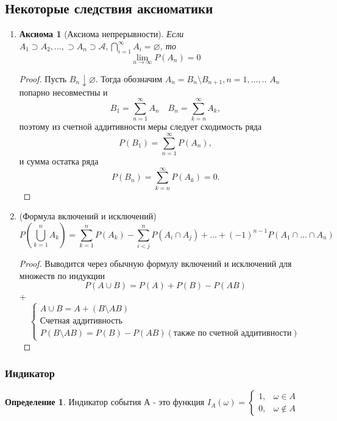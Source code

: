 \documentclass[a4paper]{article}
\newtheorem*{axiom}{Аксиома}
\theoremstyle{definition}
\newtheorem*{definition}{Определение}
\theoremstyle{remark}
\begin{document}
\subsection{Некоторые следствия аксиоматики}
\begin{enumerate}
    \item \begin{axiom}[Аксиома непрерывности]
        Если $A_1\supset A_2, \dots, \supset A_n \supset \mathcal{A}, \bigcap\limits_{i = 1}^\infty A_i = \varnothing$, то
        \[\lim\limits_{n\to \infty} P(A_n) = 0\]
    \end{axiom}
    \begin{proof}
        Пусть $B_n\downarrow \varnothing$. Тогда обозначим $A_n = B_n \setminus B_{n+1}, n = 1, \dots, .$. $A_n$ попарно несовместны и 
        \[B_1  =    \sum\limits_{n = 1}^\infty A_n \quad B_n  =  \sum\limits_{k = n}^\infty A_k, \]
        поэтому из счетной аддитивности меры следует сходимость ряда \[P(B_1)=\sum\limits_{n = 1}^\infty P(A_n),\] и сумма остатка ряда \[P(B_n) =  \sum\limits_{k = n}^\infty P(A_k) = 0.\] 
    \end{proof}
    \item (Формула включений и исключений)
    \[P(\bigcup\limits_{k = 1}^n A_k)  = \sum_{k = 1}^n P(A_k) - \sum_{i < j}^n P(A_i \cap A_j) + \dots + {(-1)}^{n-1} P(A_1 \cap \dots  \cap A_n)\]
    \begin{proof}
        Выводится через обычную формулу включений и исключений для множеств по индукции \[P(A \cup B) = P(A) + P(B) - P(AB)\]+ 
        \[\begin{cases}
            A \cup B = A + (B\setminus AB) \\ 
            \text{Счетная аддитивность} \\ 
            P(B \setminus AB) = P(B) - P(AB) (\text{также по счетной аддитивности})
        \end{cases}
        \]
    \end{proof}
\end{enumerate}
\subsubsection{Индикатор}
\begin{definition}
    Индикатор события А - это функция $I_A(\omega) = \begin{cases}
        1,  & \omega \in A \\
        0,  & \omega \notin A
        \end{cases}$
\end{definition}
\end{document}
